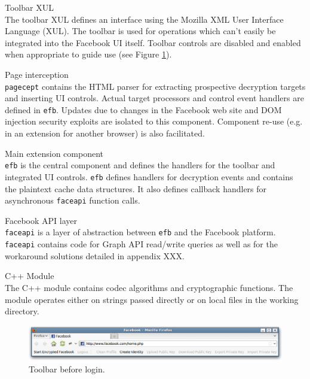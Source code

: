     \begin{sdesc}
     
    \item[Toolbar XUL] \hfill \\ The toolbar XUL defines an interface using the Mozilla XML User Interface Language (XUL). The toolbar is used for operations which can't easily be integrated into the Facebook UI itself. Toolbar controls are disabled and enabled when appropriate to guide use (see Figure \ref{scn:toolbar}).
    
    \item[Page interception] \hfill \\ {\tt pagecept} contains the HTML parser for extracting prospective decryption targets and inserting UI controls. Actual target processors and control event handlers are defined in {\tt efb}. Updates due to changes in the Facebook web site and DOM injection security exploits are isolated to this component. Component re-use (e.g. in an extension for another browser) is also facilitated. 

    \item[Main extension component] \hfill \\ {\tt efb} is the central component and defines the handlers for the toolbar and integrated UI controls. {\tt efb} defines handlers for decryption events and contains the plaintext cache data structures. It also defines callback handlers for asynchronous {\tt faceapi} function calls.
    
    \item[Facebook API layer] \hfill \\ {\tt faceapi} is a layer of abstraction between {\tt efb} and the Facebook platform. {\tt faceapi} contains code for Graph API read/write queries as well as for the workaround solutions detailed in appendix XXX.

    \item[C++ Module] \hfill \\ The C++ module contains codec algorithms and cryptographic functions. The module operates either on strings passed directly or on local files in the working directory.
    
    \end{sdesc}
    
        \begin{figure}[tbph]
        \begin{center}
                \includegraphics[width=12cm]{screens/toolbar.png}
            \caption{Toolbar before login.}
            \label{scn:toolbar}
        \end{center}
    \end{figure}
    

